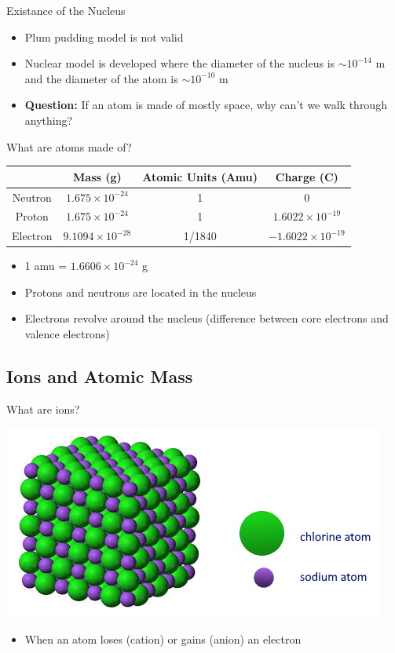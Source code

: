 \documentclass[11pt]{beamer}
\begin{document}
\begin{frame}{Existance of the Nucleus}
  \begin{itemize}
  \item Plum pudding model is not valid
  \item Nuclear model is developed where the diameter of the nucleus
    is $\sim 10^{-14}$ m and the diameter of the atom is $\sim 10^{-10}$ m
  \item \textbf{Question:} If an atom is made of mostly space,
    why can't we walk through anything?
  \end{itemize}
\end{frame}

\begin{frame}{What are atoms made of?}
  \centering
  \begin{tabular}{c|ccc}
    & Mass (g) & Atomic Units (Amu) & Charge (C) \\
    \hline
    Neutron  & $1.675\times 10^{-24}$ & 1 & 0 \\
    Proton   & $1.675\times 10^{-24}$ & 1 & $1.6022\times 10^{-19}$ \\
    Electron & $9.1094\times 10^{-28}$ & 1/1840 & $-1.6022\times 10^{-19}$
  \end{tabular}

  \begin{itemize}
  \item 1 amu = $1.6606 \times 10^{-24}$ g
  \item Protons and neutrons are located in the nucleus
  \item Electrons revolve around the nucleus (difference between
    core electrons and valence electrons)
  \end{itemize}
\end{frame}

\subsection{Ions and Atomic Mass}

\begin{frame}{What are ions?}
  \begin{center}
    \includegraphics[scale=0.5]{nacl}
  \end{center}

  \begin{itemize}
  \item When an atom loses (cation) or gains (anion) an electron
  \end{itemize}
\end{frame}
\end{document}
